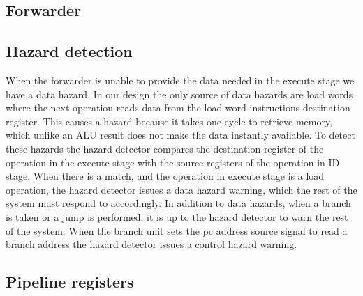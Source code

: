 \subsection{Forwarder}
\label{section:Forwarder}

\subsection{Hazard detection}
When the forwarder is unable to provide the data needed in the execute stage we have a data hazard. In our design the only source of data hazards are load words where the next operation reads data from the load word instructions destination register. 
This causes a hazard because it takes one cycle to retrieve memory, which unlike an ALU result does not make the data instantly available. 
To detect these hazards the hazard detector compares the destination register of the operation in the execute stage with the source registers of the operation in ID stage.
When there is a match, and the operation in execute stage is a load operation, the hazard detector issues a data hazard warning, which the rest of the system must respond to accordingly.
In addition to data hazards, when a branch is taken or a jump is performed, it is up to the hazard detector to warn the rest of the system.
When the branch unit sets the pc address source signal to read a branch address the hazard detector issues a control hazard warning.

\subsection{Pipeline registers}
